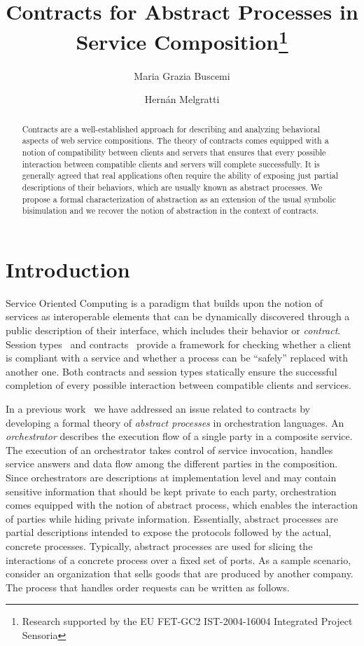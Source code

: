 \documentclass[submission,copyright,creativecommons]{eptcs}
\title{Contracts for Abstract Processes in Service Composition\thanks{
 Research supported
by the EU FET-GC2 IST-2004-16004 Integrated Project {\sc Sensoria}}}
\author{Maria Grazia Buscemi        
\institute{IMT Lucca Institute for Advanced Studies, Italy} 
        \email{m.buscemi@imtlucca.it}
 \and 
 Hern\'an Melgratti
\institute{FCEyN, University of Buenos Aires, Argentina}
\institute{CONICET}
\email{hmelgra@dc.uba.ar}
}
\begin{document}
\maketitle

\begin{abstract}
Contracts are a well-established approach for describing and analyzing behavioral aspects of web service compositions. The theory of contracts comes equipped with a notion of compatibility between clients and servers that ensures that every possible interaction between compatible clients and servers will complete successfully. It is generally agreed that real applications often require the ability of exposing  just  partial descriptions of their behaviors, which are usually known as abstract processes.  We propose a formal characterization of abstraction as an extension of the usual symbolic bisimulation and we recover the notion of abstraction in the context of contracts. 
\end{abstract}

\section{Introduction}
Service Oriented Computing is a paradigm that builds upon the notion of 
services as interoperable elements that can be dynamically discovered through a 
public description
of their interface, which includes their behavior or \emph{contract}.
Session types~\cite{Honda93,DezaniECCOP06,GayHole} and contracts~\cite{LaneveP07,CastagnaGP08,CGP09:TCWS,BZ:TUTCCCC} 
provide a framework for checking whether a client is compliant with a service
and whether a process can be ``safely'' replaced with another one. 
Both contracts and session types statically ensure the successful completion 
of every possible interaction between compatible clients and services. 


In a previous work~\cite{BM:APOL} we have addressed an issue related to 
contracts
by developing a formal theory of \emph{abstract processes} in 
orchestration languages.
An {\em orchestrator} describes the execution flow of a single party in 
a composite
service. The execution of an orchestrator takes control of service 
invocation, handles
service answers and data flow among the different parties in the 
composition. Since
orchestrators are descriptions at implementation level and may contain 
sensitive information
that should be kept private to each party, orchestration comes equipped 
with the notion of
abstract process, which enables the interaction of parties while hiding 
private information.
Essentially, abstract processes are partial descriptions intended to 
expose the protocols
followed by the actual, concrete processes. Typically, abstract 
processes are used for slicing
the interactions of a concrete process over a fixed set of ports. 
As a sample scenario, consider an organization that sells goods that are produced
by another company. The process that handles order requests can be written as follows.
\end{document}
